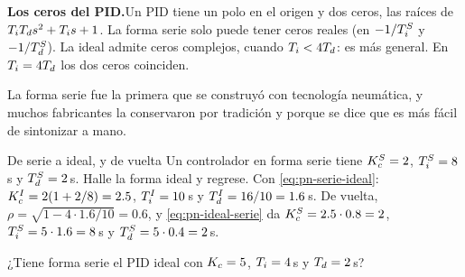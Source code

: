 \begin{ideaclave}
\textbf{Los ceros del PID.}\enspace Un PID tiene un polo en el origen y dos ceros, las raíces de $T_iT_d s^2+T_i s+1$. La forma serie solo puede tener ceros reales (en $-1/T_i^S$ y $-1/T_d^S$). La ideal admite ceros complejos, cuando $T_i<4T_d$: es más general. En $T_i=4T_d$ los dos ceros coinciden.
\end{ideaclave}

La forma serie fue la primera que se construyó con tecnología neumática, y muchos fabricantes la conservaron por tradición y porque se dice que es más fácil de sintonizar a mano.

\begin{ejemplo}[label=ej:pn-conversion]{De serie a ideal, y de vuelta}
Un controlador en forma serie tiene $K_c^S=2$, $T_i^S=8$\,s y $T_d^S=2$\,s. Halle la forma ideal y regrese.
\solucion Con \eqref{eq:pn-serie-ideal}: $K_c^I=2(1+2/8)=2.5$, $T_i^I=10$\,s y $T_d^I=16/10=1.6$\,s. De vuelta, $\rho=\sqrt{1-4\cdot1.6/10}=0.6$, y \eqref{eq:pn-ideal-serie} da $K_c^S=2.5\cdot0.8=2$, $T_i^S=5\cdot1.6=8$\,s y $T_d^S=5\cdot0.4=2$\,s.
\end{ejemplo}


\begin{pausa}
¿Tiene forma serie el PID ideal con $K_c=5$, $T_i=4$\,s y $T_d=2$\,s?
\end{pausa}
